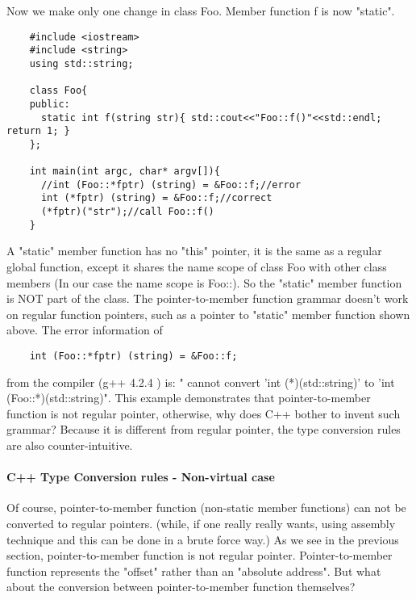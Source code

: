 \documentclass{book}
\begin{document}
Now we make only one change in class Foo. Member function f is now "static".

\begin{lstlisting}
    #include <iostream>
    #include <string>
    using std::string;
     
    class Foo{
    public:
      static int f(string str){ std::cout<<"Foo::f()"<<std::endl; return 1; }
    };
     
    int main(int argc, char* argv[]){
      //int (Foo::*fptr) (string) = &Foo::f;//error 
      int (*fptr) (string) = &Foo::f;//correct
      (*fptr)("str");//call Foo::f()
    }
\end{lstlisting}
A "static" member function has no "this" pointer, it is the same as a regular global function,
except it shares the name scope of class Foo with other class members (In our case the name scope is Foo::).
So the "static" member function is NOT part of the class. 
The pointer-to-member function grammar doesn't work on regular function pointers, such as a pointer to "static" member function shown above. The error information of

\begin{lstlisting}
    int (Foo::*fptr) (string) = &Foo::f;
\end{lstlisting}
from the compiler (g++ 4.2.4 ) is: " cannot convert 'int (*)(std::string)' to 'int (Foo::*)(std::string)". 
This example demonstrates that pointer-to-member function is not regular pointer, otherwise,
why does C++ bother to invent such grammar? Because it is different from regular pointer, the type conversion rules are also counter-intuitive.

\paragraph{C++ Type Conversion rules - Non-virtual case}

Of course, pointer-to-member function (non-static member functions) can not be converted to regular pointers.
(while, if one really really wants, using assembly technique and this can be done in a brute force way.)
As we see in the previous section, pointer-to-member function is not regular pointer. 
Pointer-to-member function represents the "offset" rather than an "absolute address".
But what about the conversion between pointer-to-member function themselves?
\end{document}

